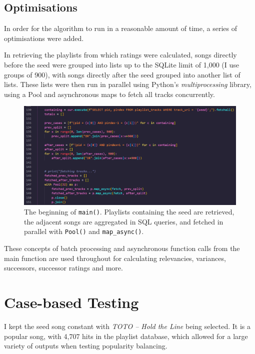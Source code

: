 \documentclass[a4paper, 12pt]{report}
\begin{document}
\section{Optimisations}\label{section:optimisations}
In order for the algorithm to run in a reasonable amount of time, a series of optimisations were added.

In retrieving the playlists from which ratings were calculated, songs directly before the seed were grouped into lists up to the SQLite limit of 1,000 (I use groups of 900),
with songs directly after the seed grouped into another list of lists.
These lists were then run in parallel using Python's \textit{multiprocessing} library, using a Pool and asynchronous maps to fetch all tracks concurrently.
\begin{figure}[H]
    \centering
    \includegraphics[width=\textwidth]{fetch.png}
    \caption{The beginning of \texttt{main()}. Playlists containing the seed are retrieved, the adjacent songs are aggregated in SQL queries, and fetched in parallel with \texttt{Pool()} and \texttt{map\_async()}.}
\end{figure}
These concepts of batch processing and asynchronous function calls from the main function are used throughout for calculating relevancies, variances, successors, successor ratings and more.

\chapter{Case-based Testing}
I kept the seed song constant with \textit{TOTO -- Hold the Line} being selected. It is a popular song, with 4,707 hits in the playlist database,
which allowed for a large variety of outputs when testing popularity balancing.
\end{document}
